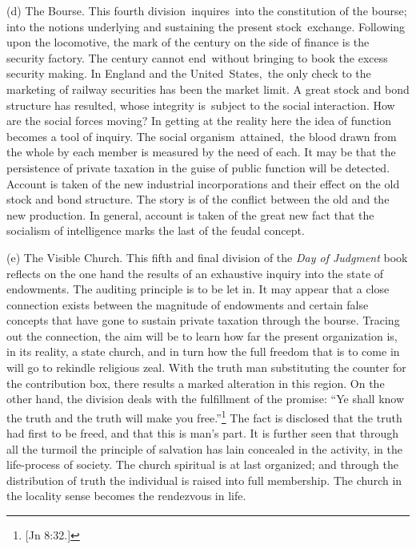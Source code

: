 \documentclass[openany,nobib]{tufte-book}
\begin{document}
\begin{hangparas}{.25in}{1}
(d) The Bourse. This fourth division~inquires~into the constitution of
the bourse; into the notions underlying and sustaining the present
stock~exchange. Following upon the locomotive, the mark of the century
on the side of finance is the security factory. The century cannot
end~without bringing to book the excess security making. In England and
the United~States,~the only check to the marketing of railway securities
has been the market limit. A great stock and bond structure has
resulted, whose integrity is~subject to the social interaction. How are
the social forces moving? In getting at the reality here the idea of
function becomes a tool of inquiry. The social organism~attained,~the
blood drawn from the whole by each member is measured by the need of
each. It may be that the persistence of private taxation in the guise of
public function will be detected. Account is taken of the new industrial
incorporations and their effect on the old stock and bond structure. The
story is of the conflict between the old and the new production. In
general, account is taken of the great new fact that the socialism of
intelligence marks the last of the feudal concept.~~

(e) The Visible Church. This fifth and final division of the \emph{Day
of Judgment} book reflects on the one hand the results of an exhaustive
inquiry into the state of endowments. The auditing principle is to be
let in. It may appear that a close connection exists between the
magnitude of endowments and certain false concepts that have gone to
sustain private taxation through the bourse. Tracing out the connection,
the aim will be to learn how far the present organization is, in its
reality, a state church, and in turn how the full freedom that is to
come in will go to rekindle religious zeal. With the truth man
substituting the counter for the contribution box, there results a
marked alteration in this region. On the other hand, the division deals
with the fulfillment of the promise: ``Ye shall know the truth and the
truth will make you free.''\footnote{{[}Jn 8:32.{]}} The fact is
disclosed that the truth had first to be freed, and that this is man's
part. It is further seen that through all the turmoil the principle of
salvation has lain concealed in the activity, in the life-process of
society. The church spiritual is at last organized; and through the
distribution of truth the individual is raised into full membership. The
church in the locality sense becomes the rendezvous in life.~

\end{hangparas}
\end{document}
